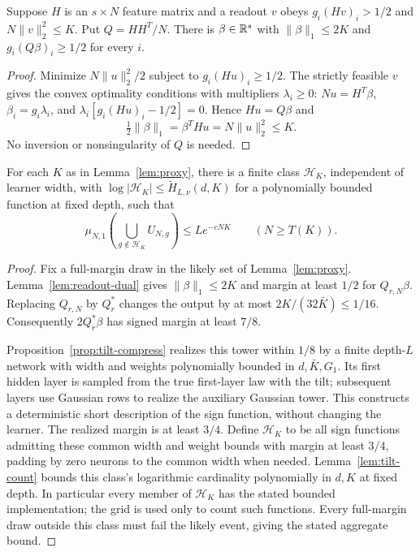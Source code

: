 \begin{lemma}\label{lem:readout-dual}
Suppose $H$ is an $s\times N$ feature matrix and a readout $v$ obeys
$g_i(Hv)_i>1/2$ and $N\|v\|_2^2\leq K$. Put $Q=HH^T/N$.
There is $\beta\in\mathbb R^s$ with $\|\beta\|_1\leq2K$ and
$g_i(Q\beta)_i\geq1/2$ for every $i$.
\end{lemma}
\begin{proof}
Minimize $N\|u\|_2^2/2$ subject to $g_i(Hu)_i\geq1/2$.
The strictly feasible $v$ gives the convex optimality conditions with
multipliers $\lambda_i\geq0$:
$Nu=H^T\beta$, $\beta_i=g_i\lambda_i$, and
$\lambda_i[g_i(Hu)_i-1/2]=0$. Hence $Hu=Q\beta$ and
\[
 \tfrac12\|\beta\|_1=\beta^THu=N\|u\|_2^2\leq K.
\]
No inversion or nonsingularity of $Q$ is needed.
\end{proof}

\begin{proposition}\label{prop:mf-aggregate}
For each $K$ as in Lemma~\ref{lem:proxy}, there is a finite class
$\mathcal H_K$, independent of learner width, with
$\log|\mathcal H_K|\leq\widetilde H_{L,\nu}(d,K)$ for a
polynomially bounded function at fixed depth, such that
\[
 \mu_{N,1}\!\left(\bigcup_{g\notin\mathcal H_K}U_{N,g}\right)
 \leq Le^{-cNK}\qquad(N\geq T(K)).
\]
\end{proposition}
\begin{proof}
Fix a full-margin draw in the likely set of Lemma~\ref{lem:proxy}.
Lemma~\ref{lem:readout-dual} gives $\|\beta\|_1\leq2K$ and margin
at least $1/2$ for $Q_{r,N}\beta$. Replacing $Q_{r,N}$ by $Q_r^*$
changes the output by at most $2K/(32\bar K)\leq1/16$.
Consequently $2Q_r^*\beta$ has signed margin at least $7/8$.

Proposition~\ref{prop:tilt-compress} realizes this tower within $1/8$
by a finite depth-$L$ network with width and weights polynomially bounded
in $d,\bar K,G_1$. Its first hidden layer is sampled from the true
first-layer law with the tilt; subsequent layers use Gaussian rows to
realize the auxiliary Gaussian tower. This constructs a deterministic
short description of the sign function, without changing the learner.
The realized margin is at least $3/4$. Define $\mathcal H_K$ to be all
sign functions admitting these common width and weight bounds with margin
at least $3/4$, padding by zero neurons to the common width when needed.
Lemma~\ref{lem:tilt-count} bounds this class's logarithmic cardinality
polynomially in $d,K$ at fixed depth. In particular every member of
$\mathcal H_K$ has the stated bounded implementation; the grid is used
only to count such functions. Every full-margin draw outside this class
must fail the likely event, giving the stated aggregate bound.
\end{proof}

